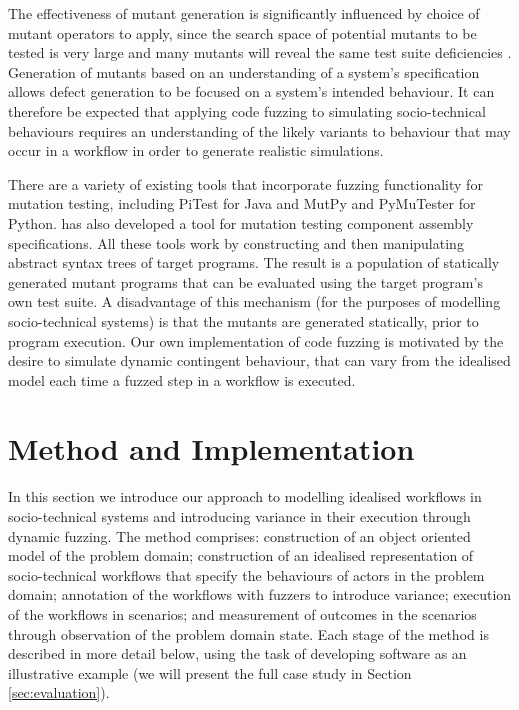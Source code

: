 \documentclass{sig-alternate}
\begin{document}
The effectiveness of mutant generation is significantly influenced by choice of
mutant operators to apply, since the search space of potential mutants to be
tested is very large and many mutants will reveal the same test suite
deficiencies \citep{takanen08fuzzing}.  Generation of mutants based on an
understanding of a system's specification allows defect generation to be focused
on a system's intended behaviour.  It can therefore be expected that applying
code fuzzing to simulating socio-technical behaviours requires an understanding
of the likely variants to behaviour that may occur in a workflow in order to
generate realistic simulations.

There are a variety of existing tools that incorporate fuzzing functionality for
mutation testing, including PiTest \citep{coles14pitest} for Java and MutPy
\citep{mutpy26} and PyMuTester \citep{pymuttester} for Python.
\citet{storer15ringneck-repos} has also developed a tool for mutation testing
component assembly specifications. All these tools work by constructing and then
manipulating abstract syntax trees of target programs.  The result is a
population of statically generated mutant programs that can be evaluated using
the target program's own test suite.  A disadvantage of this mechanism (for the
purposes of modelling socio-technical systems) is that the mutants are generated
statically, prior to program execution.  Our own implementation of code fuzzing
is motivated by the desire to simulate dynamic contingent behaviour, that can
vary from the idealised model each time a fuzzed step in a workflow is executed.



\section{Method and Implementation}
\label{sec:fuzzi-moss}


In this section we introduce our approach to modelling idealised workflows in
socio-technical systems and introducing variance in their execution through
dynamic fuzzing. The method comprises: construction of an object oriented model
of the problem domain; construction of an idealised representation of
socio-technical workflows that specify the behaviours of actors in the problem
domain; annotation of the workflows with fuzzers to introduce variance;
execution of the workflows in scenarios; and measurement of outcomes in the
scenarios through observation of the problem domain state. Each stage of the
method is described in more detail below, using the task of developing software
as an illustrative example (we will present the full case study in Section
\ref{sec:evaluation}).
\end{document}
